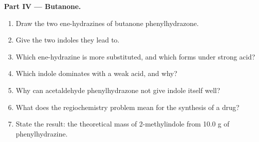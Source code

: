 \begin{problem}
\medskip\noindent\textbf{Part IV --- Butanone.}
\begin{enumerate}[resume]
  \item Draw the two ene-hydrazines of butanone phenylhydrazone.
  \item Give the two indoles they lead to.
  \item Which ene-hydrazine is more substituted, and which forms under strong acid?
  \item Which indole dominates with a weak acid, and why?
  \item Why can acetaldehyde phenylhydrazone not give indole itself well?
  \item What does the regiochemistry problem mean for the synthesis of a drug?
  \item State the result: the theoretical mass of 2-methylindole from 10.0 g of
        phenylhydrazine.
\end{enumerate}
\end{problem}
